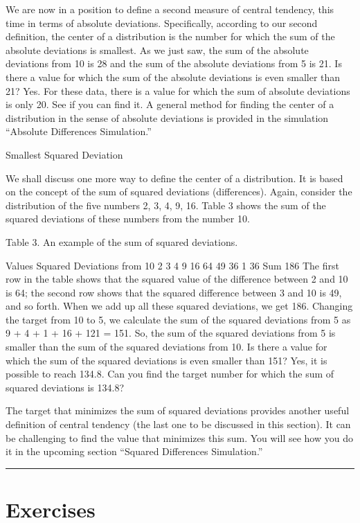 \documentclass[
]{book}
\begin{document}
We are now in a position to define a second measure of central tendency, this time in terms of absolute deviations. Specifically, according to our second definition, the center of a distribution is the number for which the sum of the absolute deviations is smallest. As we just saw, the sum of the absolute deviations from 10 is 28 and the sum of the absolute deviations from 5 is 21. Is there a value for which the sum of the absolute deviations is even smaller than 21? Yes. For these data, there is a value for which the sum of absolute deviations is only 20. See if you can find it. A general method for finding the center of a distribution in the sense of absolute deviations is provided in the simulation ``Absolute Differences Simulation.''

Smallest Squared Deviation

We shall discuss one more way to define the center of a distribution. It is based on the concept of the sum of squared deviations (differences). Again, consider the distribution of the five numbers 2, 3, 4, 9, 16. Table 3 shows the sum of the squared deviations of these numbers from the number 10.

Table 3. An example of the sum of squared deviations.

Values Squared Deviations
from 10
2
3
4
9
16 64
49
36
1
36
Sum 186
The first row in the table shows that the squared value of the difference between 2 and 10 is 64; the second row shows that the squared difference between 3 and 10 is 49, and so forth. When we add up all these squared deviations, we get 186. Changing the target from 10 to 5, we calculate the sum of the squared deviations from 5 as 9 + 4 + 1 + 16 + 121 = 151. So, the sum of the squared deviations from 5 is smaller than the sum of the squared deviations from 10. Is there a value for which the sum of the squared deviations is even smaller than 151? Yes, it is possible to reach 134.8. Can you find the target number for which the sum of squared deviations is 134.8?

The target that minimizes the sum of squared deviations provides another useful definition of central tendency (the last one to be discussed in this section). It can be challenging to find the value that minimizes this sum. You will see how you do it in the upcoming section ``Squared Differences Simulation.''

\begin{center}\rule{0.5\linewidth}{0.5pt}\end{center}

\hypertarget{exercises-6}{%
\section{Exercises}\label{exercises-6}}
\end{document}
